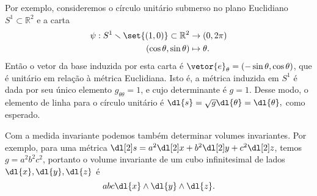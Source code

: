Por exemplo, consideremos o círculo unitário submerso no plano Euclidiano \(S^1 \subset \mathbb{R}^2\) e a carta
\begin{align*}
    \psi : S^1 \smallsetminus \set{(1,0)} \subset \mathbb{R}^2 &\to (0, 2\pi)\\
    (\cos\theta,\sin\theta)&\mapsto \theta.
\end{align*}
Então o vetor da base induzida por esta carta é \(\vetor{e}_\theta = (-\sin\theta, \cos\theta)\), que é unitário em relação à métrica Euclidiana. Isto é, a métrica induzida em \(S^1\) é dada por seu único elemento \(g_{\theta\theta} = 1\), e cujo determinante é \(g = 1\). Desse modo, o elemento de linha para o círculo unitário é \(\dl{s} = \sqrt{g}\dl{\theta} = \dl{\theta},\) como esperado.

Com a medida invariante podemos também determinar volumes invariantes. Por exemplo, para uma métrica \(\dl[2]s = a^2 \dl[2]x + b^2\dl[2]y + c^2\dl[2]z\), temos \(g = a^2b^2c^2\), portanto o volume invariante de um cubo infinitesimal de lados \(\dl{x}, \dl{y}, \dl{z}\) é
\[abc \dl{x}\wedge\dl{y}\wedge\dl{z}.\]
